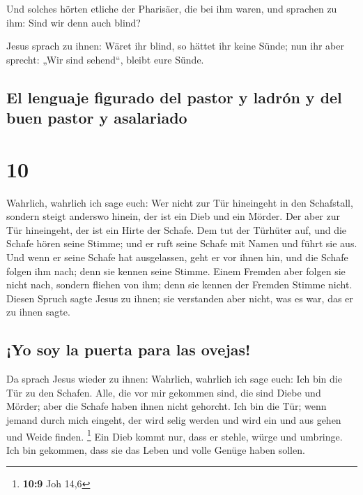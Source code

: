  Und solches hörten etliche der Pharisäer, die bei ihm
waren, und sprachen zu ihm: Sind wir denn auch blind?

 Jesus sprach zu ihnen: Wäret ihr blind, so hättet ihr
keine Sünde; nun ihr aber sprecht: „Wir sind sehend``, bleibt eure
Sünde.

\hypertarget{el-lenguaje-figurado-del-pastor-y-ladruxf3n-y-del-buen-pastor-y-asalariado}{%
\subsection{El lenguaje figurado del pastor y ladrón y del buen pastor y
asalariado}\label{el-lenguaje-figurado-del-pastor-y-ladruxf3n-y-del-buen-pastor-y-asalariado}}

\hypertarget{section-9}{%
\section{10}\label{section-9}}

 Wahrlich, wahrlich ich sage euch: Wer nicht zur Tür
hineingeht in den Schafstall, sondern steigt anderswo hinein, der ist
ein Dieb und ein Mörder.  Der aber zur Tür hineingeht, der
ist ein Hirte der Schafe.  Dem tut der Türhüter auf, und
die Schafe hören seine Stimme; und er ruft seine Schafe mit Namen und
führt sie aus.  Und wenn er seine Schafe hat ausgelassen,
geht er vor ihnen hin, und die Schafe folgen ihm nach; denn sie kennen
seine Stimme.  Einem Fremden aber folgen sie nicht nach,
sondern fliehen von ihm; denn sie kennen der Fremden Stimme nicht.
 Diesen Spruch sagte Jesus zu ihnen; sie verstanden aber
nicht, was es war, das er zu ihnen sagte.

\hypertarget{yo-soy-la-puerta-para-las-ovejas}{%
\subsection{¡Yo soy la puerta para las
ovejas!}\label{yo-soy-la-puerta-para-las-ovejas}}

 Da sprach Jesus wieder zu ihnen: Wahrlich, wahrlich ich
sage euch: Ich bin die Tür zu den Schafen.  Alle, die vor
mir gekommen sind, die sind Diebe und Mörder; aber die Schafe haben
ihnen nicht gehorcht.  Ich bin die Tür; wenn jemand durch
mich eingeht, der wird selig werden und wird ein und aus gehen und Weide
finden. \footnote{\textbf{10:9} Joh 14,6}  Ein Dieb kommt
nur, dass er stehle, würge und umbringe. Ich bin gekommen, dass sie das
Leben und volle Genüge haben sollen.

